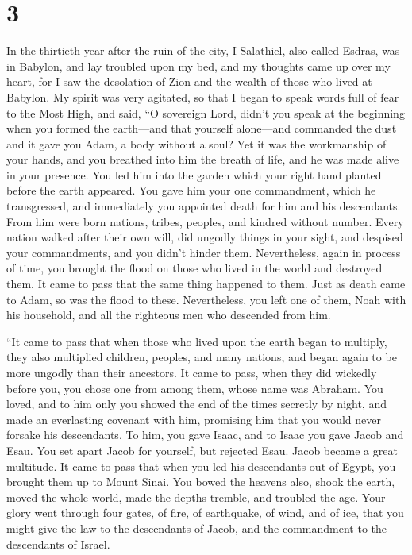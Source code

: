 \hypertarget{section-2}{%
\section{3}\label{section-2}}

 In the thirtieth year after the ruin of the city, I
Salathiel, also called Esdras, was in Babylon, and lay troubled upon my
bed, and my thoughts came up over my heart,  for I saw the
desolation of Zion and the wealth of those who lived at Babylon.
 My spirit was very agitated, so that I began to speak
words full of fear to the Most High, and said,  ``O
sovereign Lord, didn't you speak at the beginning when you formed the
earth---and that yourself alone---and commanded the dust 
and it gave you Adam, a body without a soul? Yet it was the workmanship
of your hands, and you breathed into him the breath of life, and he was
made alive in your presence.  You led him into the garden
which your right hand planted before the earth appeared. 
You gave him your one commandment, which he transgressed, and
immediately you appointed death for him and his descendants. From him
were born nations, tribes, peoples, and kindred without number.
 Every nation walked after their own will, did ungodly
things in your sight, and despised your commandments, and you didn't
hinder them.  Nevertheless, again in process of time, you
brought the flood on those who lived in the world and destroyed them.
 It came to pass that the same thing happened to them.
Just as death came to Adam, so was the flood to these. 
Nevertheless, you left one of them, Noah with his household, and all the
righteous men who descended from him.

 ``It came to pass that when those who lived upon the
earth began to multiply, they also multiplied children, peoples, and
many nations, and began again to be more ungodly than their ancestors.
 It came to pass, when they did wickedly before you, you
chose one from among them, whose name was Abraham.  You
loved, and to him only you showed the end of the times secretly by
night,  and made an everlasting covenant with him,
promising him that you would never forsake his descendants. To him, you
gave Isaac, and to Isaac you gave Jacob and Esau.  You
set apart Jacob for yourself, but rejected Esau. Jacob became a great
multitude.  It came to pass that when you led his
descendants out of Egypt, you brought them up to Mount Sinai.
 You bowed the heavens also, shook the earth, moved the
whole world, made the depths tremble, and troubled the age.
 Your glory went through four gates, of fire, of
earthquake, of wind, and of ice, that you might give the law to the
descendants of Jacob, and the commandment to the descendants of Israel.

